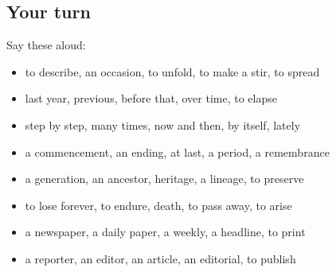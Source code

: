 \subsection*{Your turn}
Say these aloud:

\begin{itemize}
\raggedright
  \item to describe, an occasion, to unfold, to make a stir, to spread
  \item last year, previous, before that, over time, to elapse
  \item step by step, many times, now and then, by itself, lately
  \item a commencement, an ending, at last, a period, a remembrance
  \item a generation, an ancestor, heritage, a lineage, to preserve
  \item to lose forever, to endure, death, to pass away, to arise
  \item a newspaper, a daily paper, a weekly, a headline, to print
  \item a reporter, an editor, an article, an editorial, to publish
\end{itemize}

